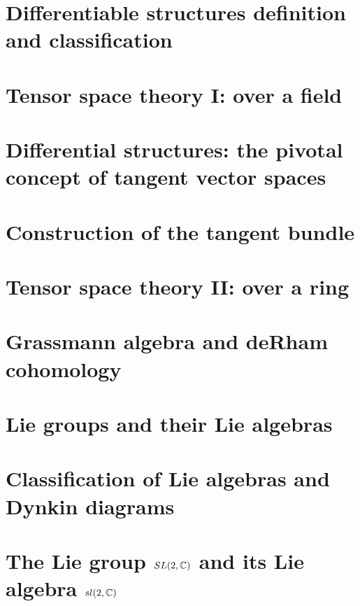 \documentclass[
11pt, %
a4paper, %
oneside, %
headinclude,footinclude, %
]{scrartcl}
\begin{document}
\section{Differentiable structures definition and classification}



\section{Tensor space theory I: over a field}



\section{Differential structures: the pivotal concept of tangent vector spaces}



\section{Construction of the tangent bundle}



\section{Tensor space theory II: over a ring}



\section{Grassmann algebra and deRham cohomology}



\section{Lie groups and their Lie algebras}



\section{Classification of Lie algebras and Dynkin diagrams}



\section{The Lie group $SL(2,\mathbb{C})$ and its Lie algebra $sl(2,\mathbb{C})$}
\end{document}

